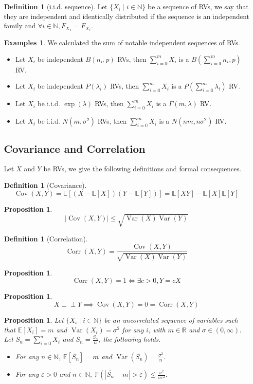 \documentclass[paper=a4, fontsize=12pt]{scrartcl} %
\newtheorem{prop}[thm]{Proposition}
\theoremstyle{definition}
\newtheorem{defn}[thm]{Definition}
\newtheorem{exmps}[thm]{Examples}
\theoremstyle{remark}
\newcommand{\R}{\mathbb{R}}
\newcommand{\N}{\mathbb{N}}
\newcommand{\E}{\mathbb{E}}
\newcommand{\Perp}{\perp\!\!\!\perp}
\renewcommand{\P}{\mathbb{P}}
\DeclareMathOperator{\vari}{Var}
\DeclareMathOperator{\cov}{Cov}
\DeclareMathOperator{\corr}{Corr}
\numberwithin{equation}{section} %
\numberwithin{figure}{section} %
\numberwithin{table}{section} %
\begin{document}
\begin{defn}[i.i.d. sequence]
	Let $\{X_i \mid i \in \N\}$ be a sequence of RVs, we say that they are independent and identically distributed if the sequence is an independent family and $\forall i \in \N, F_{X_1} = F_{X_i}$.
\end{defn}
\begin{exmps}
	We calculated the sum of notable independent sequences of RVs.
	\begin{itemize}
		\item Let $X_i$ be independent $B(n_i, p)$ RVs, then $\sum_{i=0}^m X_i$ is a $B(\sum_{i=0}^m n_i, p)$ RV.
		\item Let $X_i$ be independent $P(\lambda_i)$ RVs, then $\sum_{i=0}^m X_i$ is a $P(\sum_{i=0}^m \lambda_i)$ RV.
		\item Let $X_i$ be i.i.d. $\exp(\lambda)$ RVs, then $\sum_{i=0}^m X_i$ is a $\Gamma(m, \lambda)$ RV.
		\item Let $X_i$ be i.i.d. $N(m,\sigma^2)$ RVs, then $\sum_{i=0}^m X_i$ is a $N(nm, n\sigma^2)$ RV.
	\end{itemize}
\end{exmps}
\subsection{Covariance and Correlation}
Let $X$ and $Y$ be RVs, we give the following definitions and formal consequences.
\begin{defn}[Covariance]
\[ \cov(X,Y) = \E[(X-\E[X])(Y-\E[Y])] = \E[XY] - \E[X]\E[Y] \]
\end{defn}
\begin{prop}
	\[ |\cov(X,Y)| \leq \sqrt{\vari(X)\vari(Y)}\]
\end{prop}
\begin{defn}[Correlation]
	\[ \corr(X,Y) = \frac{\cov(X,Y)}{\sqrt{\vari(X)\vari(Y)}} \]
\end{defn}
\begin{prop}
	\[ \corr(X,Y) = 1 \Leftrightarrow \exists c > 0, Y = cX \]
\end{prop}
\begin{prop}
	\[ X \Perp Y \implies \cov(X,Y) = 0 = \corr(X,Y)\]
\end{prop}
\begin{prop}
	Let $\{X_i \mid i \in \N\}$ be an uncorrelated sequence of variables such that $\E[X_i] = m$ and $\vari(X_i) = \sigma^2$ for any $i$, with $m \in \R$ and $\sigma \in (0,\infty)$. Let $S_n = \sum_{i=0}^n X_i$ and $\overline{S_n} = \frac{S_n}{n}$, the following holds.
	\begin{itemize}
		\item For any $n \in \N$, $\E[\overline{S_n}] = m$ and $\vari(\overline{S_n}) = \frac{\sigma^2}{n}$.
		\item For any $\varepsilon > 0$ and $n \in \N$, $\P(|\overline{S_n} - m| > \varepsilon) \leq \frac{\sigma^2}{n\varepsilon^2}$.
	\end{itemize}
\end{prop}
\end{document}
